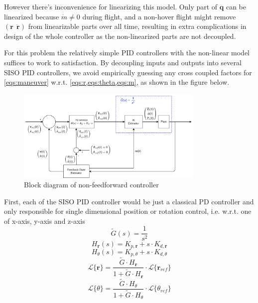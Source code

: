 \documentclass[notitlepage,twocolumn,10pt]{article}
\begin{document}
However there's inconvenience for linearizing this model. Only part of $\mathbf{q}$ can be linearized because $\dot{m} \ne 0$ during flight, and a non-hover flight might remove $\left( \mathbf{r} \;\, \dot{\mathbf{r}} \right)$ from linearizable parts over all time\cite{kim2020modeling}, resulting in extra complications in design of the whole controller as the non-linearized parts are not decoupled.     

For this problem the relatively simple PID controllers with the non-linear model suffices to work to satisfaction. By decoupling inputs and outputs into several SISO PID controllers, we avoid empirically guessing any cross coupled factors for \cref{eqs:maneuver} w.r.t. \cref{eqs:r,eqs:theta,eqs:m}, as shown in the figure below.

\begin{figure}[H] %
    \centering
    \includegraphics[width=9.0cm, keepaspectratio]{PD_block}
    \caption{Block diagram of non-feedforward controller}
    \label{fig:PD_block}
\end{figure}

First, each of the SISO PID controller would be just a classical PD controller and only responsible for single dimensional position or rotation control, i.e. w.r.t. one of x-axis, y-axis and z-axis
\begin{equation} \label{eqs:Gtilde}
\tilde{G}(s) = \frac{1}{s^2}
\end{equation}
\begin{equation} \label{eqs:Hr}
H_{\mathbf{r}}(s) = K_{p,\mathbf{r}} + s \cdot K_{d,\mathbf{r}} 
\end{equation}
\begin{equation} \label{eqs:Htheta}
H_{\theta}(s) = K_{p,\theta} + s \cdot K_{d,\theta}
\end{equation}
\begin{equation} \label{eqs:closedlooptf1}
\mathcal{L}\{ \mathbf{r} \}= \frac{\tilde{G} \cdot H_{\mathbf{r}}}{1 + \tilde{G} \cdot H_{\mathbf{r}}} \cdot \mathcal{L}\{ \mathbf{r}_{ref} \}
\end{equation}
\begin{equation} \label{eqs:closedlooptf2}
\mathcal{L}\{ \theta \}= \frac{\tilde{G} \cdot H_{\theta}}{1 + \tilde{G} \cdot H_{\theta}} \cdot \mathcal{L}\{ \theta_{ref} \}
\end{equation}
\end{document}
